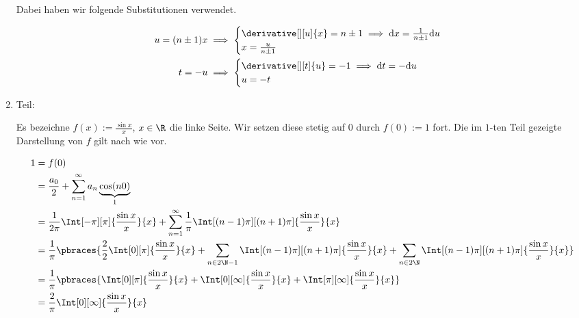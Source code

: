 \begin{solution}
\begin{enumerate}[label = \arabic*.]
    Dabei haben wir folgende Substitutionen verwendet.

    \begin{align*}
        u = (n \pm 1) x
        & \implies
        \begin{cases}
            \derivative[][u]{x} = n \pm 1 \implies \mathrm{d} x = \frac{1}{n \pm 1} \mathrm{d} u \\
            x = \frac{u}{n \pm 1}
        \end{cases} \\
        t = -u
        & \implies
        \begin{cases}
            \derivative[][t]{u} = -1 \implies \mathrm{d} t = -\mathrm{d} u \\
            u = -t
        \end{cases}
    \end{align*}

    \item Teil:
    
    Es bezeichne $f(x) := \frac{\sin x}{x}$, $x \in \R$ die linke Seite.
    Wir setzen diese stetig auf $0$ durch $f(0) := 1$ fort.
    Die im $1$-ten Teil gezeigte Darstellung von $f$ gilt nach wie vor.

    \begin{align*}
        1
        & =
        f(0) \\
        & =
        \frac{a_0}{2}
        +
        \sum_{n=1}^\infty
        a_n
        \underbrace{\cos(n 0)}_1 \\
        & =
        \frac{1}{2 \pi}
        \Int[-\pi][\pi]
        {
            \frac{\sin x}{x}
        }{x}
        +
        \sum_{n=1}^\infty
        \frac{1}{\pi}
        \Int[(n - 1) \pi][(n + 1) \pi]
        {
            \frac{\sin x}{x}
        }{x} \\
        & =
        \frac{1}{\pi}
        \pbraces
        {
            \frac{2}{2}
            \Int[0][\pi]
            {
                \frac{\sin x}{x}
            }{x}
            +
            \sum_{n \in 2 \N - 1}
            \Int[(n - 1) \pi][(n + 1) \pi]
            {
                \frac{\sin x}{x}
            }{x}
            +
            \sum_{n \in 2 \N}
            \Int[(n - 1) \pi][(n + 1) \pi]
            {
                \frac{\sin x}{x}
            }{x}
        } \\
        & =
        \frac{1}{\pi}
        \pbraces
        {
            \Int[0][\pi]
            {
                \frac{\sin x}{x}
            }{x}
            +
            \Int[0][\infty]
            {
                \frac{\sin x }{x}
            }{x}
            +
            \Int[\pi][\infty]
            {
                \frac{\sin x}{x}
            }{x}
        } \\
        & =
        \frac{2}{\pi}
        \Int[0][\infty]
        {
            \frac{\sin x}{x}
        }{x}
    \end{align*}


\end{enumerate}
\end{solution}

